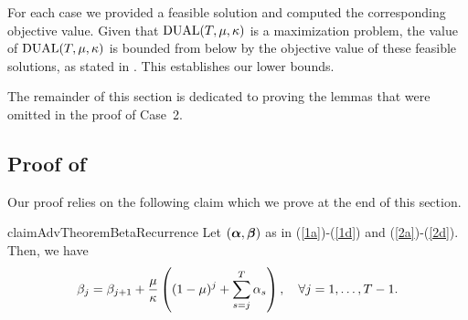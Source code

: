 
For each case we provided a feasible solution and computed the corresponding objective value. Given that $\mathrm{DUAL}(T, \mu, \kappa)$ is a maximization problem, the value of $\mathrm{DUAL}(T, \mu, \kappa)$ is bounded from below by the objective value of these feasible solutions, as stated in . This establishes our lower bounds.
\hfill\Halmos %

The remainder of this section is dedicated to proving the lemmas that were omitted in the proof of Case~2.
\subsection{Proof of }
\label{proof: AdvTheoremDConstraints}
Our proof relies on the following claim which we prove at the end of this section.

\begin{restatable}{claim}{AdvTheoremBetaRecurrence}
Let $(\bm{\alpha}, \bm{\beta})$ as in (\ref{1a})-(\ref{1d}) and (\ref{2a})-(\ref{2d}). Then, we have
\begin{equation}
    \label{eq-proof: AdvRecurrenceRelation}
    \beta_{j} = \beta_{j+1} + \frac{\mu}{\kappa} \left( (1-\mu)^j + \sum_{s=j}^T \alpha_s \right), \quad \forall j = 1, \ldots, T-1.
\end{equation}
\end{restatable}


